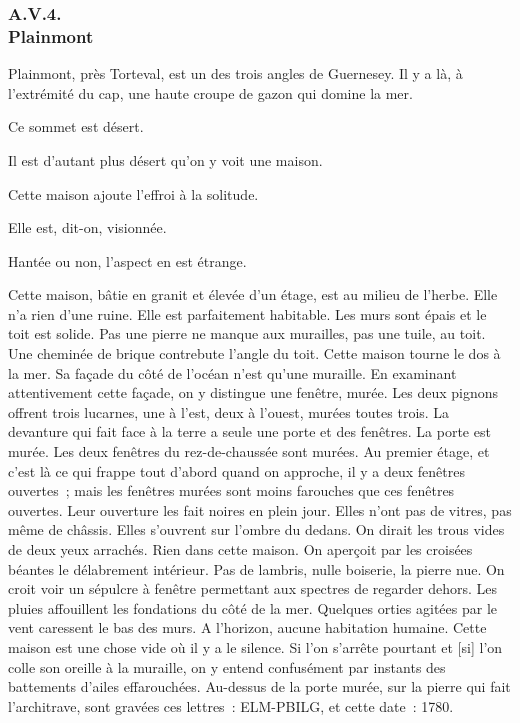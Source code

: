 \documentclass[french,twoside]{book} %
\newcommand\corr[1]{#1}
\begin{document}
 \subsubsection[{A.V.4. Plainmont}]{A.V.4. \\
Plainmont}
\noindent Plainmont, près Torteval, est un des trois angles de Guernesey. Il y a là, à l’extrémité du cap, une haute croupe de gazon qui domine la mer.\par
Ce sommet est désert.\par
Il est d’autant plus désert qu’on y voit une maison.\par
Cette maison ajoute l’effroi à la solitude.\par
Elle est, dit-on, visionnée.\par
Hantée ou non, l’aspect en est étrange.\par
Cette maison, bâtie en granit et élevée d’un étage, est au milieu de l’herbe. Elle n’a rien d’une ruine. Elle est parfaitement habitable. Les murs sont épais et le toit est solide. Pas une pierre ne manque aux murailles, pas une tuile, au toit. Une cheminée de brique contrebute l’angle du toit. Cette maison tourne le dos à la mer. Sa façade du côté de l’océan n’est qu’une muraille. En examinant attentivement cette façade, on y distingue une fenêtre, murée. Les deux pignons offrent trois lucarnes, une à l’est, deux à l’ouest, murées  toutes trois. La devanture qui fait face à la terre a seule une porte et des fenêtres. La porte est murée. Les deux fenêtres du rez-de-chaussée sont murées. Au premier étage, et c’est là ce qui frappe tout d’abord quand on approche, il y a deux fenêtres ouvertes ; mais les fenêtres murées sont moins farouches que ces fenêtres ouvertes. Leur ouverture les fait noires en plein jour. Elles n’ont pas de vitres, pas même de châssis. Elles s’ouvrent sur l’ombre du dedans. On dirait les trous vides de deux yeux arrachés. Rien dans cette maison. On aperçoit par les croisées béantes le délabrement intérieur. Pas de lambris, nulle boiserie, la pierre nue. On croit voir un sépulcre à fenêtre permettant aux spectres de regarder dehors. Les pluies affouillent les fondations du côté de la mer. Quelques orties agitées par le vent caressent le bas des murs. A l’horizon, aucune habitation humaine. Cette maison est une chose vide où il y a le silence. Si l’on s’arrête pourtant et [{\corr si}] l’on colle son oreille à la muraille, on y entend confusément par instants des battements d’ailes effarouchées. Au-dessus de la porte murée, sur la pierre qui fait l’architrave, sont gravées ces lettres : ELM-PBILG, et cette date : 1780.\par
\end{document}
